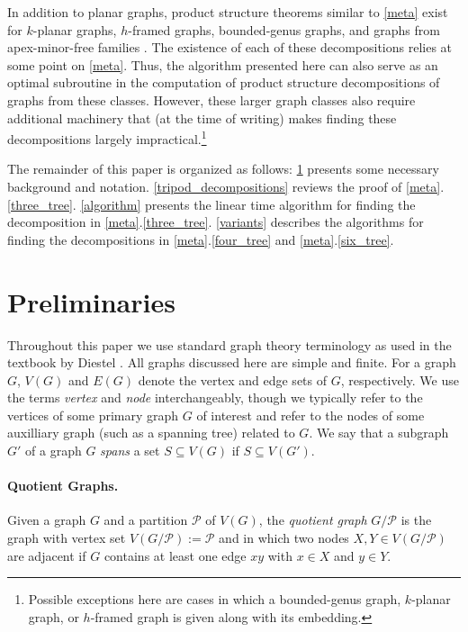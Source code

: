\documentclass{patmorin}
\begin{document}
In addition to planar graphs, product structure theorems similar to \cref{meta} exist for $k$-planar graphs, $h$-framed graphs, bounded-genus graphs, and graphs from apex-minor-free families \cite{dujmovic.joret.ea:planar,dujmovic.morin.ea:graph,bekos.dalozzo.ea:graph}.  The existence of each of these decompositions relies at some point on \cref{meta}.  Thus, the algorithm presented here can also serve as an optimal subroutine in the computation of product structure decompositions of graphs from these classes.  However, these larger graph classes also require additional machinery that (at the time of writing) makes finding these decompositions largely impractical.\footnote{Possible exceptions here are cases in which a bounded-genus graph, $k$-planar graph, or $h$-framed graph is given along with its embedding.}

The remainder of this paper is organized as follows: \cref{prelims} presents some necessary background and notation.  \cref{tripod_decompositions} reviews the proof of \cref{meta}.\ref{three_tree}.  \cref{algorithm} presents the linear time algorithm for finding the decomposition in \cref{meta}.\ref{three_tree}.  \cref{variants} describes the algorithms for finding the decompositions in \cref{meta}.\ref{four_tree} and \cref{meta}.\ref{six_tree}.

\section{Preliminaries}
\label{prelims}

Throughout this paper we use standard graph theory terminology as used in the textbook by Diestel \cite{diestel:graph}.  All graphs discussed here are simple and finite.  For a graph $G$, $V(G)$ and $E(G)$ denote the vertex and edge sets of $G$, respectively.  We use the terms \emph{vertex} and \emph{node} interchangeably, though we typically refer to the vertices of some primary graph $G$ of interest and refer to the nodes of some auxilliary graph (such as a spanning tree) related to $G$.  We say that a subgraph $G'$ of a graph $G$ \emph{spans} a set $S\subseteq V(G)$ if $S\subseteq V(G')$.


\paragraph*{Quotient Graphs.}

Given a graph $G$ and a partition $\mathcal{P}$ of $V(G)$, the \emph{quotient graph} $G/\mathcal{P}$ is the graph with vertex set $V(G/\mathcal{P}):=\mathcal{P}$ and in which two nodes $X,Y\in V(G/\mathcal{P})$ are adjacent if $G$ contains at least one edge $xy$ with $x\in X$ and $y\in Y$.
\end{document}
